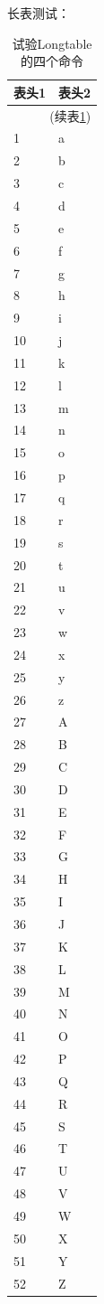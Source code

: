 长表测试：
{\normalsize\begin{longtable}{m{}<{\centering}|m{}<{\centering}}
  \caption{试验Longtable的四个命令}
  \label{tab:long-table} \\
  \toprule[2pt]
  表头1 & 表头2 \\
  \midrule[1pt]
  \endfirsthead
  \multicolumn{2}{r}{(续表\ref{tab:long-table})}\\
  \toprule[2pt]
  \endhead
  \midrule[1pt]
  \endfoot
  \bottomrule[2pt]
  \endlastfoot
  1  & a \\
  2  & b \\
  3  & c \\
  4  & d \\
  5  & e \\
  6  & f \\
  7  & g \\
  8  & h \\
  9  & i \\
  10 & j \\
  11 & k \\
  12 & l \\
  13 & m \\
  14 & n \\
  15 & o \\
  16 & p \\
  17 & q \\
  18 & r \\
  19 & s \\
  20 & t \\
  21 & u \\
  22 & v \\
  23 & w \\
  24 & x \\
  25 & y \\
  26 & z \\
  27 & A \\
  28 & B \\
  29 & C \\
  30 & D \\
  31 & E \\
  32 & F \\
  33 & G \\
  34 & H \\
  35 & I \\
  36 & J \\
  37 & K \\
  38 & L \\
  39 & M \\
  40 & N \\
  41 & O \\
  42 & P \\
  43 & Q \\
  44 & R \\
  45 & S \\
  46 & T \\
  47 & U \\
  48 & V \\
  49 & W \\
  50 & X \\
  51 & Y \\
  52 & Z \\
\end{longtable}}

